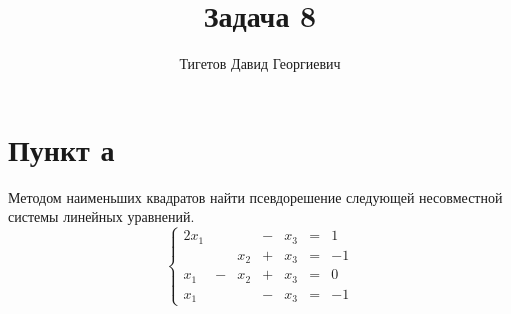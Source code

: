 \documentclass[12pt]{article}
\begin{document}
    \title{Задача 8}
    \author{Тигетов Давид Георгиевич}
    \date{}
    \maketitle

    \section*{Пункт а}
    Методом наименьших квадратов найти псевдорешение следующей несовместной системы линейных уравнений.
    \[
        \left \{
        \begin{array}{rrrrrcl}
            2 x_1 &   &     & - & x_3 & = & 1  \\
            &   & x_2 & + & x_3 & = & -1 \\
            x_1   & - & x_2 & + & x_3 & = & 0  \\
            x_1   &   &     & - & x_3 & = & -1
        \end{array}
        \right .
    \]
\end{document}
